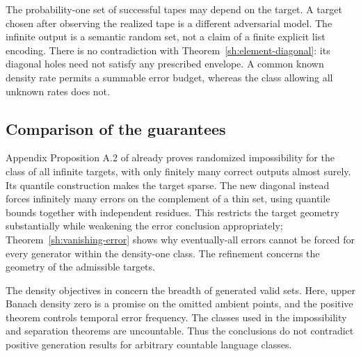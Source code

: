 The probability-one set of successful tapes may depend on the target. A target chosen after observing the realized tape is a different adversarial model. The infinite output is a semantic random set, not a claim of a finite explicit list encoding. There is no contradiction with Theorem~\ref{sh:element-diagonal}: its diagonal holes need not satisfy any prescribed envelope. A common known density rate permits a summable error budget, whereas the class allowing all unknown rates does not.

\subsection{Comparison of the guarantees}

Appendix Proposition A.2 of \citet{P10} already proves randomized impossibility for the class of all infinite targets, with only finitely many correct outputs almost surely. Its quantile construction makes the target sparse. The new diagonal instead forces infinitely many errors on the complement of a thin set, using quantile bounds together with independent residues. This restricts the target geometry substantially while weakening the error conclusion appropriately; Theorem~\ref{sh:vanishing-error} shows why eventually-all errors cannot be forced for every generator within the density-one class. The refinement concerns the geometry of the admissible targets.

The density objectives in \citet{P07,P23} concern the breadth of generated valid sets. Here, upper Banach density zero is a promise on the omitted ambient points, and the positive theorem controls temporal error frequency. The classes used in the impossibility and separation theorems are uncountable. Thus the conclusions do not contradict positive generation results for arbitrary countable language classes.
